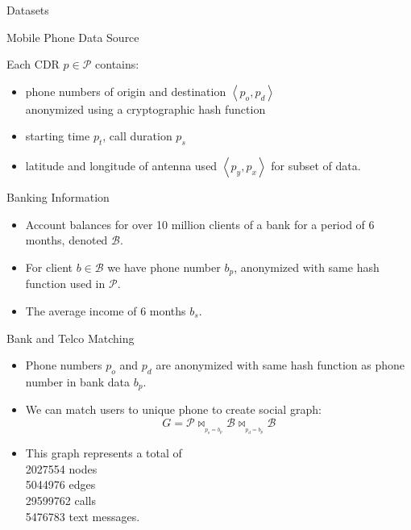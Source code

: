 \documentclass[usenames,dvipsnames]{beamer}
\newcommand{\mathB}{\mathcal{B}}
\newcommand{\mathP}{\mathcal{P}}
\begin{document}
\begin{frame}{Datasets}

\begin{block}{Mobile Phone Data Source}

Each CDR \( p \in \mathP \) contains:
\begin{itemize}
\item phone numbers of origin and destination \( \left< p_o, p_d \right> \) \\
 anonymized using a cryptographic hash function
\item starting time \( p_t \), call duration \( p_s \)
\item latitude and longitude of antenna used \( \left< p_y, p_x \right> \) for subset of data.
\end{itemize} 

\end{block}

\pause

\begin{block}{Banking Information}

\begin{itemize}
\item Account balances for over 10 million clients of a bank for a period of 6 months, denoted \( \mathB \). 
\item For client \( b \in \mathB \) we have phone number \( b_p \), anonymized with same hash function used in \( \mathP \).
\item The average income of 6 months \( b_s \).

\end{itemize}


\end{block}

\end{frame}


\begin{frame}{Bank and Telco Matching}

\begin{itemize}

\item Phone numbers $ p_o $ and $ p_d $ are anonymized with same hash function as phone number in bank data $ b_p $.

\medskip
\item We can match users to unique phone to create social graph:
$$ G = \mathP \bowtie_{_{p_o = b_p}} \mathB \bowtie_{_{p_d = b_p}} \mathB $$

\medskip
\item This graph represents a total of \\
\qquad \num{2027554} nodes \\
\qquad \num{5044976} edges \\
\qquad \num{29599762} calls \\
\qquad \num{5476783} text messages.
\end{itemize}

\end{frame}
\end{document}
